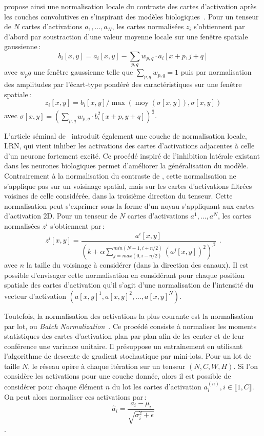 \citet{jarrett_what_2009} propose ainsi une normalisation locale du contraste des cartes d'activation après les couches convolutives en s'inspirant des modèles biologiques~\cite{pinto_why_2008}. Pour un tenseur de $N$ cartes d'activations $a_1,\dots,a_N$, les cartes normalisées $z_i$ s'obtiennent par d'abord par soustraction d'une valeur moyenne locale sur une fenêtre spatiale gaussienne\,:
$$b_i[x,y] = a_i[x,y] - \sum_{p,q} w_{p,q} \cdot a_i[x+p,j+q]$$ avec $w_pq$ une fenêtre gaussienne telle que $\sum_{p,q} w_{p,q} = 1$
puis par normalisation des amplitudes par l'écart-type pondéré des caractéristiques sur une fenêtre spatiale\,:
$$z_i[x,y] = b_i[x,y] / \max(\operatorname{moy}(\sigma[x,y]), \sigma[x,y])$$ avec $\sigma[x,y] = \left(\sum_{p,q} w_{p,q} \cdot b_i^2[x+p,y+q] \right)^{\frac{1}{2}}$.

L'article séminal de~\citet{krizhevsky_imagenet_2012} introduit également une couche de normalisation locale, \gls{LRN}, qui vient inhiber les activations des cartes d'activations adjacentes à celle d'un neurone fortement excité. Ce procédé inspiré de l'inhibition latérale existant dans les neurones biologiques permet d'améliorer la généralisation du modèle. Contrairement à la normalisation du contraste de \citet{jarrett_what_2009}, cette normalisation ne s'applique pas sur un voisinage spatial, mais sur les cartes d'activations filtrées voisines de celle considérée, dans la troisième direction du tenseur. Cette normalisation peut s'exprimer sous la forme d'un noyau s'appliquant aux cartes d'activation 2D. Pour un tenseur de $N$ cartes d'activations $a^1,\dots,a^N$, les cartes normalisées $z^i$ s'obtiennent par\,:
$$z^i[x,y] = \frac{a^i[x,y]}{\left(k + \alpha \sum_{j=max(0, i-n/2)}^{min(N-1, i+n/2)} (a^j[x,y])^2  \right)^\beta}~~.$$
avec $n$ la taille du voisinage à considérer (dans la direction des canaux). Il est possible d'envisager cette normalisation en considérant pour chaque position spatiale des cartes d'activation qu'il s'agit d'une normalisation de l'intensité du vecteur d'activation $(a[x,y]^1, a[x,y]^2, \dots, a[x,y]^N)$.

Toutefois, la normalisation des activations la plus courante est la normalisation par lot, ou \emph{Batch Normalization}~\cite{ioffe_batch_2015}. Ce procédé consiste à normaliser les moments statistiques des cartes d'activation plan par plan afin de les center et de leur conférence une variance unitaire. Il présuppose un entraînement en utilisant l'algorithme de descente de gradient stochastique par mini-lots. Pour un lot de taille $N$, le réseau opère à chaque itération sur un tenseur $(N, C, W, H)$. Si l'on considère les activations pour une couche donnée, alors il est possible de considérer pour chaque élément $n$ du lot les cartes d'activation $a^{(n)}_i, i \in \llbracket 1,C \rrbracket$. On peut alors normaliser ces activations par\,:
$$\hat{a}_i = \frac{a_i - \mu_i}{\sqrt{\sigma_i^2 + \epsilon}}$$.

